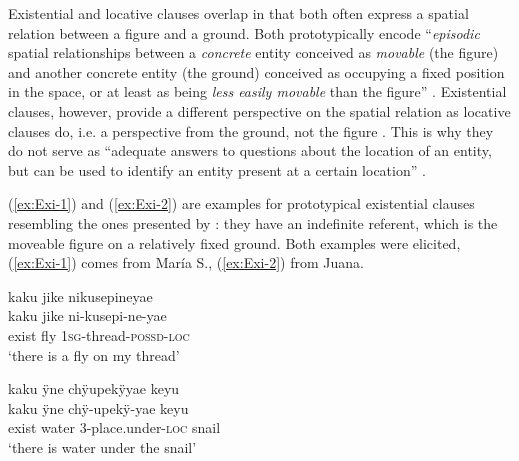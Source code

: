 Existential and locative clauses overlap in that both often express a spatial relation between a figure and a ground. Both prototypically encode “\textit{episodic} spatial relationships between a \textit{concrete} entity conceived as \textit{movable} (the figure) and another concrete entity (the ground) conceived as occupying a fixed position in the space, or at least as being \textit{less easily movable} than the figure” \citep[10]{Creissels2014a}.
 Existential clauses, however, provide a different perspective on the spatial relation as locative clauses do, i.e. a perspective from the ground, not the figure \citep[9, 18]{Creissels2014a}.
This is why they do not serve as “adequate answers to questions about the location of an entity, but can be used to identify an entity present at a certain location” \citep[2]{Creissels2014a}.

(\ref{ex:Exi-1}) and (\ref{ex:Exi-2}) are examples for prototypical existential clauses resembling the ones presented by \citet[]{Creissels2014a}: they have an indefinite referent, which is the moveable figure on a relatively fixed ground. Both examples were elicited, (\ref{ex:Exi-1}) comes from María S., (\ref{ex:Exi-2}) from Juana.

\ea\label{ex:Exi-1}
\begingl
\glpreamble kaku jike nikusepineyae\\
\gla kaku jike ni-kusepi-ne-yae\\
\glb exist fly 1\textsc{sg}-thread-\textsc{possd}-\textsc{loc}\\
\glft ‘there is a fly on my thread’
\endgl
\trailingcitation{[rxx-e181024l.092]}
\xe

\ea\label{ex:Exi-2}
\begingl
\glpreamble kaku ÿne chÿupekÿyae keyu\\
\gla kaku ÿne chÿ-upekÿ-yae keyu\\
\glb exist water 3-place.under-\textsc{loc} snail\\
\glft ‘there is water under the snail’
\endgl
\trailingcitation{[jcx-e090727s.035]}
\xe


